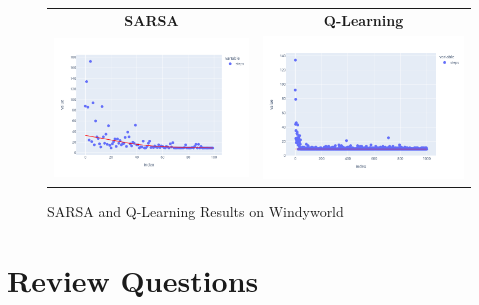 \begin{figure}
\centering
\begin{tabular}{cc}
\textbf{SARSA} & \textbf{Q-Learning} \\
\includegraphics[width=.45\textwidth]{rl_into/windyworld_sarsa.png} & 
\includegraphics[width=.45\textwidth]{rl_into/windyworld_q_learning.png} 
\end{tabular}
\caption{SARSA and Q-Learning Results on Windyworld}
\label{fig:sarsaqlearning}
\end{figure}

\section{Review Questions}

